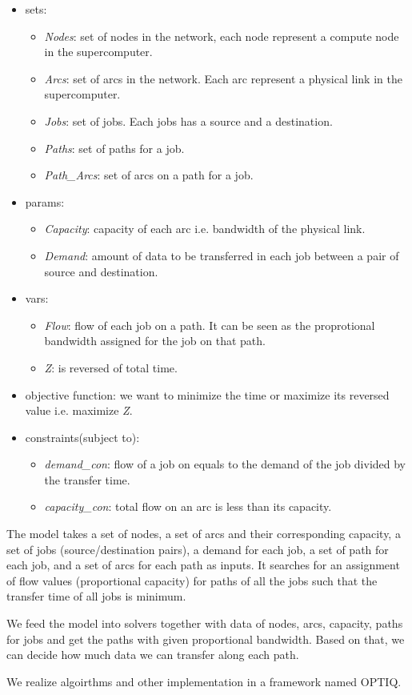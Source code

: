 \begin{itemize}
    \item sets: 
	\begin{itemize}
	    \item \textit{Nodes}: set of nodes in the network, each node represent a compute node in the supercomputer.
	    \item \textit{Arcs}: set of arcs in the network. Each arc represent a physical link in the supercomputer.
	    \item \textit{Jobs}: set of jobs. Each jobs has a source and a destination.
	    \item  \textit{Paths}: set of paths for a job.
	    \item \textit{Path\_Arcs}: set of arcs on a path for a job.
	\end{itemize}
    \item params: 
	\begin{itemize}
	    \item {\it Capacity}: capacity of each arc i.e. bandwidth of the physical link.
	    \item {\it Demand}: amount of data to be transferred in each job between a pair of source and destination.
	\end{itemize}
    \item vars:
	 \begin{itemize}
	    \item \textit{Flow}: flow of each job on a path. It can be seen as the proprotional bandwidth assigned for the job on that path.
	    \item \textit{Z}: is reversed of total time.
	\end{itemize}
    \item objective function: we want to minimize the time or maximize its reversed value i.e. maximize \textit{Z}.
    \item constraints(subject to): 
	\begin{itemize}
	    \item \textit{demand\_con}: flow of a job on equals to the demand of the job divided by the transfer time.
	    \item \textit{capacity\_con}: total flow on an arc is less than its capacity.
	\end{itemize}
\end{itemize}

The model takes a set of nodes, a set of arcs and their corresponding capacity, a set of jobs (source/destination pairs), a demand for each job, a set of path for each job, and a set of arcs for each path as inputs. It searches for an assignment of flow values (proportional capacity) for paths of all the jobs such that the transfer time of all jobs is minimum.

We feed the model into solvers together with data of nodes, arcs, capacity, paths for jobs and get the paths with given proportional bandwidth. Based on that, we can decide how much data we can transfer along each path.

We realize algoirthms and other implementation in a framework named OPTIQ.
